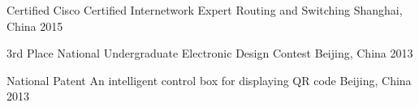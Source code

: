 



\begin{cvhonors}

  \cvhonor
    {Certified} %
    {Cisco Certified Internetwork Expert Routing and Switching} %
    {Shanghai, China} %
    {2015} %


\end{cvhonors}




\begin{cvhonors}

  \cvhonor
    {3rd Place} %
    {National Undergraduate Electronic Design Contest} %
    {Beijing, China} %
    {2013} %

  \cvhonor
    {National Patent} %
    {An intelligent control box for displaying QR code} %
    {Beijing, China} %
    {2013} %


\end{cvhonors}
